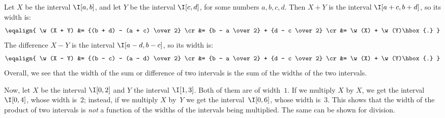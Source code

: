 Let $X$ be the interval $\I[a,b]$, and let $Y$ be the interval $\I[c,d]$, for some numbers $a, b, c, d$.  Then $X+Y$ is the interval $\I[a+c, b+d]$, so its width is:
$$
\def\w{\mathop{\rm width}}
\eqalign{
\w(X + Y) &= {(b + d) - (a + c) \over 2} \cr
          &= {b - a \over 2} + {d - c \over 2} \cr
          &= \w(X) + \w(Y)\hbox{.}
}
$$
The difference $X-Y$ is the interval $\I[a - d, b - c]$, so its width is:
$$
\def\w{\mathop{\rm width}}
\eqalign{
\w(X - Y) &= {(b - c) - (a - d) \over 2} \cr
          &= {b - a \over 2} + {d - c \over 2} \cr
          &= \w(X) + \w(Y)\hbox{.}
}
$$
Overall, we see that the width of the sum or difference of two intervals is the sum of the widths of the two intervals. 

Now, let $X$ be the interval $\I[0,2]$ and $Y$ the interval $\I[1,3]$.  Both of them are of width~$1$.  If we multiply $X$ by $X$, we get the interval~$\I[0,4]$, whose width is~$2$;  instead, if we multiply $X$ by~$Y$ we get the interval~$\I[0,6]$, whose width is~$3$.  This shows that the width of the product of two intervals is {\em not} a function of the widths of the intervals being multiplied.  The same can be shown for division.
